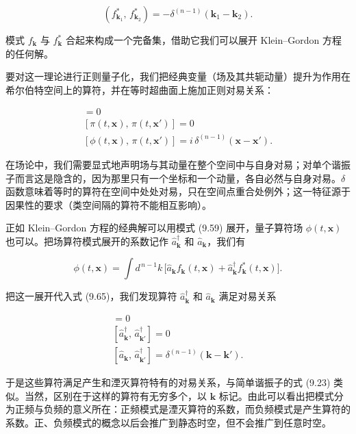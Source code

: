\begin{equation*}
(f^{*}_{\mathbf{k}_1},\, f^{*}_{\mathbf{k}_2}) = -\delta^{(n-1)}(\mathbf{k}_1-\mathbf{k}_2).
\tag{9.64}
\end{equation*}

模式 $f_{\mathbf{k}}$ 与 $f^{*}_{\mathbf{k}}$ 合起来构成一个完备集，借助它我们可以展开 Klein--Gordon 方程的任何解。

要对这一理论进行正则量子化，我们把经典变量（场及其共轭动量）提升为作用在希尔伯特空间上的算符，并在等时超曲面上施加正则对易关系：

\begin{gather*}
[\phi(t,\mathbf{x}),\, \phi(t,\mathbf{x}')] = 0 \\
[\pi(t,\mathbf{x}),\, \pi(t,\mathbf{x}')] = 0 \\
[\phi(t,\mathbf{x}),\, \pi(t,\mathbf{x}')] = i\,\delta^{(n-1)}(\mathbf{x}-\mathbf{x}').
\tag{9.65}
\end{gather*}

在场论中，我们需要显式地声明场与其动量在整个空间中与自身对易；对单个谐振子而言这是隐含的，因为那里只有一个坐标和一个动量，各自必然与自身对易。$\delta$ 函数意味着等时的算符在空间中处处对易，只在空间点重合处例外；这一特征源于因果性的要求（类空间隔的算符不能相互影响）。

正如 Klein--Gordon 方程的经典解可以用模式 (9.59) 展开，量子算符场 $\phi(t,\mathbf{x})$ 也可以。把场算符模式展开的系数记作 $\hat{a}^{\dagger}_{\mathbf{k}}$ 和 $\hat{a}_{\mathbf{k}}$，我们有

\begin{equation*}
\phi(t,\mathbf{x}) = \int d^{\,n-1}k\,\bigl[\hat{a}_{\mathbf{k}}f_{\mathbf{k}}(t,\mathbf{x}) + \hat{a}^{\dagger}_{\mathbf{k}}f^{*}_{\mathbf{k}}(t,\mathbf{x})\bigr].
\tag{9.66}
\end{equation*}

把这一展开代入式 (9.65)，我们发现算符 $\hat{a}^{\dagger}_{\mathbf{k}}$ 和 $\hat{a}_{\mathbf{k}}$ 满足对易关系

\begin{gather*}
[\hat{a}_{\mathbf{k}},\, \hat{a}_{\mathbf{k}'}] = 0 \\
[\hat{a}^{\dagger}_{\mathbf{k}},\, \hat{a}^{\dagger}_{\mathbf{k}'}] = 0 \\
[\hat{a}_{\mathbf{k}},\, \hat{a}^{\dagger}_{\mathbf{k}'}] = \delta^{(n-1)}(\mathbf{k}-\mathbf{k}').
\tag{9.67}
\end{gather*}

于是这些算符满足产生和湮灭算符特有的对易关系，与简单谐振子的式 (9.23) 类似。当然，区别在于这样的算符有无穷多个，以 $\mathbf{k}$ 标记。由此可以看出把模式分为正频与负频的意义所在：正频模式是湮灭算符的系数，而负频模式是产生算符的系数。正、负频模式的概念以后会推广到静态时空，但不会推广到任意时空。

